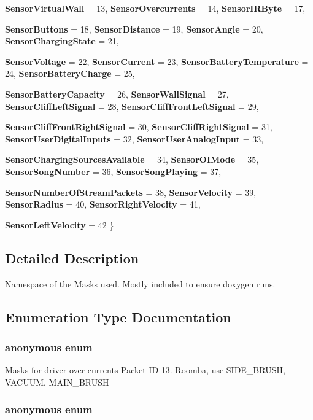 \begin{DoxyCompactItemize}
{\bfseries SensorVirtualWall} =  13, 
{\bfseries SensorOvercurrents} =  14, 
{\bfseries SensorIRByte} =  17, 
\par
{\bfseries SensorButtons} =  18, 
{\bfseries SensorDistance} =  19, 
{\bfseries SensorAngle} =  20, 
{\bfseries SensorChargingState} =  21, 
\par
{\bfseries SensorVoltage} =  22, 
{\bfseries SensorCurrent} =  23, 
{\bfseries SensorBatteryTemperature} =  24, 
{\bfseries SensorBatteryCharge} =  25, 
\par
{\bfseries SensorBatteryCapacity} =  26, 
{\bfseries SensorWallSignal} =  27, 
{\bfseries SensorCliffLeftSignal} =  28, 
{\bfseries SensorCliffFrontLeftSignal} =  29, 
\par
{\bfseries SensorCliffFrontRightSignal} =  30, 
{\bfseries SensorCliffRightSignal} =  31, 
{\bfseries SensorUserDigitalInputs} =  32, 
{\bfseries SensorUserAnalogInput} =  33, 
\par
{\bfseries SensorChargingSourcesAvailable} =  34, 
{\bfseries SensorOIMode} =  35, 
{\bfseries SensorSongNumber} =  36, 
{\bfseries SensorSongPlaying} =  37, 
\par
{\bfseries SensorNumberOfStreamPackets} =  38, 
{\bfseries SensorVelocity} =  39, 
{\bfseries SensorRadius} =  40, 
{\bfseries SensorRightVelocity} =  41, 
\par
{\bfseries SensorLeftVelocity} =  42
 \}
\end{DoxyCompactItemize}


\subsection{Detailed Description}
Namespace of the Masks used. Mostly included to ensure doxygen runs. 

\subsection{Enumeration Type Documentation}
\hypertarget{namespaceroomba_masks_a53a5dd5a5c3e3f04ad521bfc07499f7f}{
\subsubsection[{"@5}]{\setlength{\rightskip}{0pt plus 5cm}anonymous enum}}
\label{namespaceroomba_masks_a53a5dd5a5c3e3f04ad521bfc07499f7f}
Masks for driver over-\/currents Packet ID 13. Roomba, use SIDE\_\-BRUSH, VACUUM, MAIN\_\-BRUSH \hypertarget{namespaceroomba_masks_a757c0df4e6ad61c0034379e107d9f8c2}{
\subsubsection[{"@6}]{\setlength{\rightskip}{0pt plus 5cm}anonymous enum}}
\label{namespaceroomba_masks_a757c0df4e6ad61c0034379e107d9f8c2}


